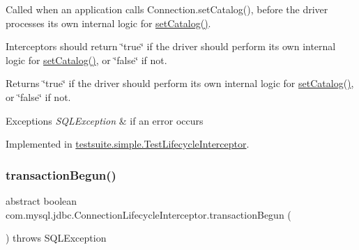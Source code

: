 Called when an application calls Connection.\+set\+Catalog(), before the driver processes its own internal logic for \mbox{\hyperlink{interfacecom_1_1mysql_1_1jdbc_1_1_connection_lifecycle_interceptor_a1b4e6d4cd345e6ac103df4cc0d6807a1}{set\+Catalog()}}.

Interceptors should return \char`\"{}true\char`\"{} if the driver should perform its own internal logic for \mbox{\hyperlink{interfacecom_1_1mysql_1_1jdbc_1_1_connection_lifecycle_interceptor_a1b4e6d4cd345e6ac103df4cc0d6807a1}{set\+Catalog()}}, or \char`\"{}false\char`\"{} if not.

\begin{DoxyReturn}{Returns}
\char`\"{}true\char`\"{} if the driver should perform its own internal logic for \mbox{\hyperlink{interfacecom_1_1mysql_1_1jdbc_1_1_connection_lifecycle_interceptor_a1b4e6d4cd345e6ac103df4cc0d6807a1}{set\+Catalog()}}, or \char`\"{}false\char`\"{} if not.
\end{DoxyReturn}

\begin{DoxyExceptions}{Exceptions}
{\em S\+Q\+L\+Exception} & if an error occurs \\
\hline
\end{DoxyExceptions}


Implemented in \mbox{\hyperlink{classtestsuite_1_1simple_1_1_test_lifecycle_interceptor_accae42bd1b1d7a51fa35a6f375bf4ce4}{testsuite.\+simple.\+Test\+Lifecycle\+Interceptor}}.

\mbox{\label{interfacecom_1_1mysql_1_1jdbc_1_1_connection_lifecycle_interceptor_accfde1498fb7224e65b1557ff9efe873}} 
\subsubsection{\texorpdfstring{transaction\+Begun()}{transactionBegun()}}
{\footnotesize\ttfamily abstract boolean com.\+mysql.\+jdbc.\+Connection\+Lifecycle\+Interceptor.\+transaction\+Begun (\begin{DoxyParamCaption}{ }\end{DoxyParamCaption}) throws S\+Q\+L\+Exception\hspace{0.3cm}{\ttfamily [abstract]}}


